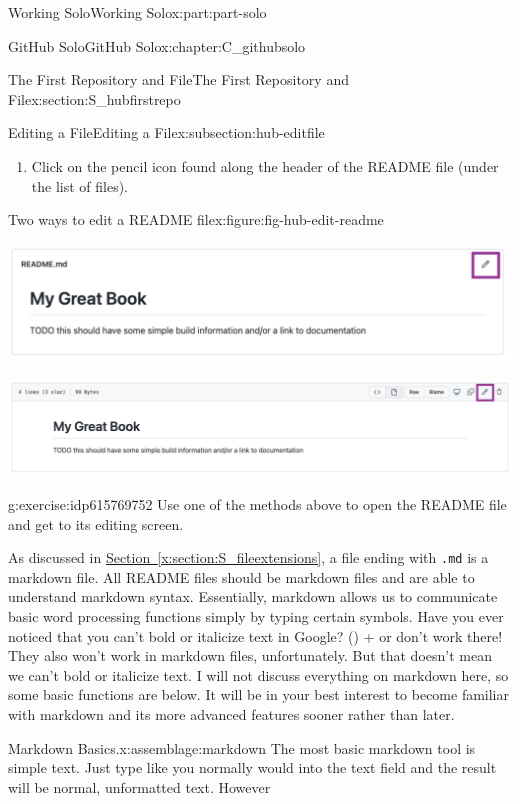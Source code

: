\documentclass[oneside,10pt,]{book}
\newcommand{\xreffont}{\relax}
\newcommand{\mono}[1]{\texttt{#1}}
\newcommand{\kbd}[1]{\keys{{#1}}}
\begin{document}
\begin{partptx}{Working Solo}{}{Working Solo}{}{}{x:part:part-solo}
\begin{chapterptx}{GitHub Solo}{}{GitHub Solo}{}{}{x:chapter:C_githubsolo}
\begin{sectionptx}{The First Repository and File}{}{The First Repository and File}{}{}{x:section:S_hubfirstrepo}
\begin{subsectionptx}{Editing a File}{}{Editing a File}{}{}{x:subsection:hub-editfile}
\begin{enumerate}
\item{}Click on the pencil icon found along the header of the README file (under the list of files).%
\end{enumerate}
%
\begin{figureptx}{Two ways to edit a README file}{x:figure:fig-hub-edit-readme}{}%
\begin{image}{0.05}{0.9}{0.05}%
\includegraphics[width=\linewidth]{external/hub_edit_readme_code.pdf}
\end{image}%
\begin{image}{0.05}{0.9}{0.05}%
\includegraphics[width=\linewidth]{external/hub_edit_readme_file.pdf}
\end{image}%
\tcblower
\end{figureptx}%
\begin{inlineexercise}{}{g:exercise:idp615769752}%
Use one of the methods above to open the README file and get to its editing screen.%
\end{inlineexercise}%
As discussed in \hyperref[x:section:S_fileextensions]{Section~{\xreffont\ref{x:section:S_fileextensions}}}, a file ending with \mono{.md} is a markdown file. All README files should be markdown files and are able to understand markdown syntax. Essentially, markdown allows us to communicate basic word processing functions simply by typing certain symbols. Have you ever noticed that you can't bold or italicize text in Google? \kbd{Control} (\kbd{Command}) + \kbd{B} or \kbd{I} don't work there! They also won't work in markdown files, unfortunately. But that doesn't mean we can't bold or italicize text. I will not discuss everything on markdown here, so some basic functions are below. It will be in your best interest to become familiar with markdown and its more advanced features sooner rather than later.%
\begin{assemblage}{Markdown Basics.}{x:assemblage:markdown}%
The most basic markdown tool is simple text. Just type like you normally would into the text field and the result will be normal, unformatted text. However\textellipsis{}%

\end{assemblage}
\end{subsectionptx}
\end{sectionptx}
\end{chapterptx}
\end{partptx}
\end{document}
